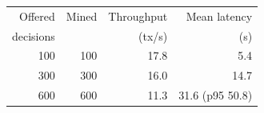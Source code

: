 \begin{tabular}{@{}rrrr@{}}
\toprule
Offered & Mined & Throughput & Mean latency \\
decisions & & (tx/s) & (s) \\
\midrule
100 & 100 & 17.8 & 5.4 \\
300 & 300 & 16.0 & 14.7 \\
600 & 600 & 11.3 & 31.6 (p95 50.8) \\
\bottomrule
\end{tabular}
